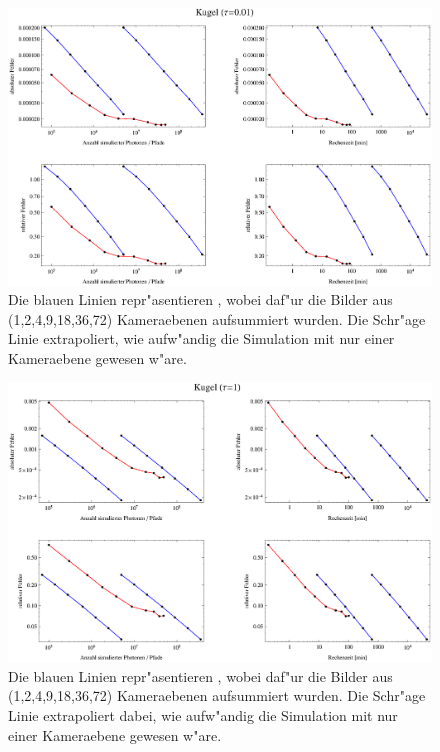 		\begin{figure}
			\centering
			\includegraphics[angle=90,height=1.0\textheight]{sphere1errorplot.eps}
			\caption{Die blauen Linien repr"asentieren \mctd, wobei daf"ur die Bilder aus (1,2,4,9,18,36,72) Kameraebenen aufsummiert wurden. Die Schr"age Linie extrapoliert, wie aufw"andig die Simulation mit nur einer Kameraebene gewesen w"are.}
			\label{fig:sphere1_error}
		\end{figure}
		\begin{figure}
			\centering
			\includegraphics[angle=90,height=1.0\textheight]{sphere2errorplot.eps}
			\caption{Die blauen Linien repr"asentieren \mctd, wobei daf"ur die Bilder aus (1,2,4,9,18,36,72) Kameraebenen aufsummiert wurden. Die Schr"age Linie extrapoliert dabei, wie aufw"andig die Simulation mit nur einer Kameraebene gewesen w"are.}
			\label{fig:sphere2_error}
		\end{figure}
